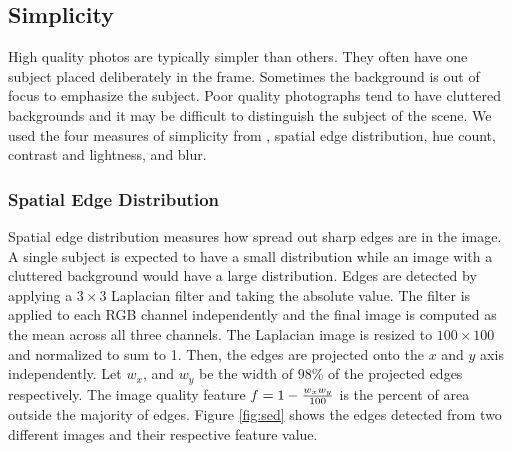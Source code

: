 \documentclass[conference,a4paper]{IEEEtran}
\begin{document}
  \subsection{Simplicity}
  High quality photos are typically simpler than others.  They often have one subject placed deliberately in the frame.  Sometimes the background is out of focus to emphasize the subject.  Poor quality photographs tend to have cluttered backgrounds and it may be difficult to distinguish the subject of the scene.  We used the four measures of simplicity from \cite{ke2006design}, spatial edge distribution, hue count, contrast and lightness, and blur.

  \subsubsection{Spatial Edge Distribution}
  Spatial edge distribution measures how spread out sharp edges are in the image.  A single subject is expected to have a small distribution while an image with a cluttered background would have a large distribution.  Edges are detected by applying a $3\times3$ Laplacian filter and taking the absolute value.  The filter is applied to each RGB channel independently and the final image is computed as the mean across all three channels.  The Laplacian image is resized to $100\times100$ and normalized to sum to 1.  Then, the edges are projected onto the $x$ and $y$ axis independently.  Let $w_x$, and $w_y$ be the width of $98\%$ of the projected edges respectively.  The image quality feature $f = 1 - {w_x w_y \over 100}$ is the percent of area outside the majority of edges.  Figure \ref{fig:sed} shows the edges detected from two different images and their respective feature value.
\end{document}

